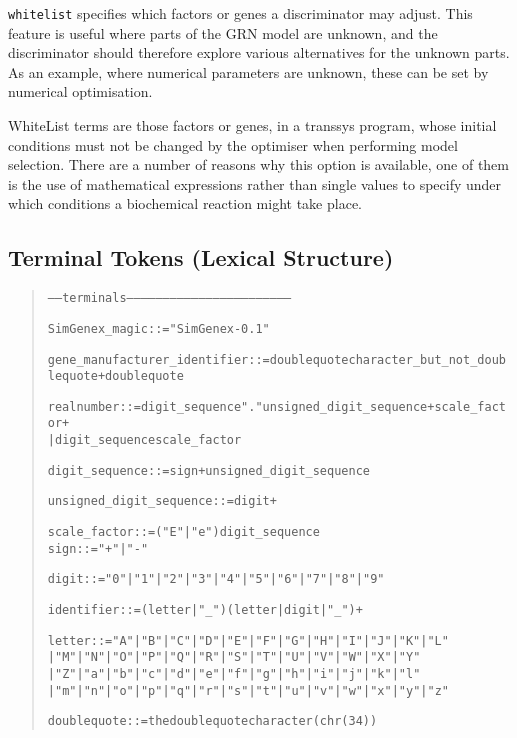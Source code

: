 \documentclass[a4paper,fleqn]{article}
\newcommand{\computercode}[1]{\texttt{#1}}
\newenvironment{ebnfrule}{\begin{footnotesize}\begin{quote}\begin{alltt}}{\end{alltt}\end{quote}\end{footnotesize}}
\begin{document}
\computercode{whitelist} specifies which factors or genes a discriminator may adjust. 
This feature is useful where parts of the GRN model are unknown, and the discriminator should
therefore explore various alternatives for the unknown parts. As an
example, where numerical parameters are unknown, these can be set by
numerical optimisation.

WhiteList terms are those factors or genes, in a transsys program, whose
initial conditions must not be changed by the optimiser when performing
model selection. There are a number of reasons why this option is available, 
one of them is the use of mathematical expressions rather than single values
to specify under which conditions a biochemical reaction might take place.

\subsection{Terminal Tokens (Lexical Structure)}

\begin{ebnfrule}
----- terminals --------------------------------------------------------------------

SimGenex_magic ::= "SimGenex-0.1" 


gene_manufacturer_identifier ::= doublequote character_but_not_doublequote+ doublequote

realnumber ::= digit_sequence "." unsigned_digit_sequence+ scale_factor+
                | digit_sequence scale_factor

digit_sequence ::= sign+ unsigned_digit_sequence

unsigned_digit_sequence ::= digit+


scale_factor ::= ("E" | "e") digit_sequence
sign ::=  "+" | "-"


digit ::= "0" | "1" | "2" | "3" | "4" | "5" | "6" | "7" | "8" | "9"

identifier ::= (letter | "_") (letter | digit | "_")+

letter ::= "A" | "B" | "C" | "D" | "E" | "F" | "G" | "H" | "I" | "J" | "K"| "L" 
| "M" | "N" | "O" | "P" | "Q" | "R" | "S" | "T" | "U" | "V" | "W"| "X" | "Y" 
| "Z"| "a" | "b" | "c" | "d" | "e" | "f" | "g" | "h" | "i" | "j" | "k"| "l" 
| "m" | "n" | "o" | "p" | "q" | "r" | "s" | "t" | "u" | "v" | "w" | "x" | "y" | "z"

doublequote ::= the doublequote character (chr(34))
\end{ebnfrule}


\end{document}
